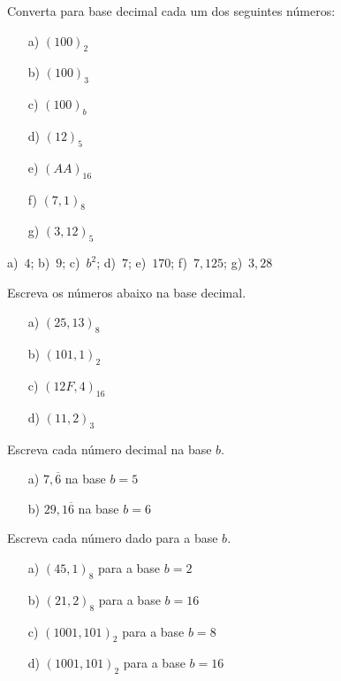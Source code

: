 \documentclass[main.tex]{subfiles}
\begin{document}
\indent 
\begin{Exercise} Converta para base decimal cada um dos seguintes números:
  \begin{multicols}{4}
    \begin{itemize}
    \item[a)]  $(100)_2$
    \item[b)]  $(100)_3$
    \item[c)]  $(100)_b$
    \item[d)]  $(12)_5$
    \item[e)]  $(AA)_{16}$
    \item[f)]  $(7,1)_8$
    \item[g)]  $(3,12)_5$
    \end{itemize}    
  \end{multicols}
\end{Exercise}
\begin{Answer}
  \begin{tiny}
    a)~$4$; b)~$9$; c)~$b^2$; d)~$7$; e)~$170$; f)~$7,125$; g)~$3,28$
  \end{tiny}
\end{Answer}

\begin{Exercise}Escreva os números abaixo na base decimal.
  \begin{itemize}
  \item[a)] $(25,13)_8$
  \item[b)] $(101,1)_2$
  \item[c)] $(12F,4)_{16}$
  \item[d)] $(11,2)_{3}$
  \end{itemize}
\end{Exercise}

\begin{Exercise} Escreva cada número decimal na base $b$.
  \begin{itemize}
  \item[a)] $7,\overline{6}$ na base $b=5$
  \item[b)] $29,1\overline{6}$ na base $b=6$
  \end{itemize}
\end{Exercise}

\begin{Exercise} Escreva cada número dado para a base $b$.
  \begin{itemize}
  \item[a)] $(45,1)_8$ para a base $b=2$
  \item[b)] $(21,2)_8$ para a base $b=16$
  \item[c)] $(1001,101)_2$ para a base $b=8$
  \item[d)] $(1001,101)_2$ para a base $b=16$
  \end{itemize}
\end{Exercise}
\end{document}
